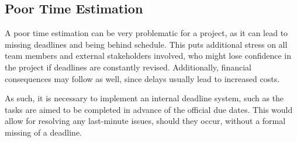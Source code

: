 \subsection{Poor Time Estimation}
A poor time estimation can be very problematic for a project, as it can lead to missing deadlines and being behind schedule. This puts additional stress on all team members and external stakeholders involved, who might lose confidence in the project if deadlines are constantly revised. Additionally, financial consequences may follow as well, since delays usually lead to increased costs.

As such, it is necessary to implement an internal deadline system, such as the tasks are aimed to be completed in advance of the official due dates. This would allow for resolving any last-minute issues, should they occur, without a formal missing of a deadline.
